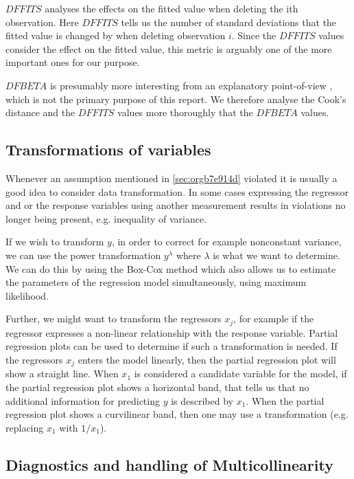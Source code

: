\documentclass[11pt]{article}
\begin{document}
\(DFFITS\) analyses the effects on the fitted value when deleting the ith observation. Here \(DFFITS\) tells us
the number of standard deviations that the fitted value is changed by when deleting observation \(i\). Since 
the \(DFFITS\) values consider the effect on the fitted value, this metric is arguably one of the more important 
ones for our purpose.

\(DFBETA\) is presumably more interesting from an explanatory point-of-view \cite{22286}, which is not the
primary purpose of this report. We therefore analyse the Cook's distance and the \(DFFITS\) values more
thoroughly that the \(DFBETA\) values.

\subsection{Transformations of variables}
\label{sec:org6a9f382}

Whenever an assumption mentioned in \ref{sec:orgb7e914d} violated it is usually a good idea to consider data 
transformation. In some cases expressing the regressor and or the response variables using another measurement
results in violations no longer being present, e.g. inequality of variance. 

If we wish to transform \(y\), in order to correct for example nonconstant variance, we can use the power
transformation \(y^\lambda\) where \(\lambda\) is what we want to determine. We can do this by using the Box-Cox method
which also allows us to estimate the parameters of the regression model simultaneously, using maximum likelihood.

Further, we might want to transform the regressors \(x_j\), for example if the regressor expresses a non-linear 
relationship with the response variable. Partial regression plots can be used to determine if such a transformation
is needed. If the regressors \(x_j\) enters the model linearly, then the partial regression plot will show a
straight line. When \(x_1\) is considered a candidate variable for the model, if the
partial regression plot shows a horizontal band, that tells us that no additional information for predicting \(y\) is 
described by \(x_1\). When the partial regression plot shows a curvilinear band, then one may use a transformation 
(e.g. replacing \(x_1\) with \(1/x_1\)).

\subsection{Diagnostics and handling of Multicollinearity}
\label{sec:orge4b1b42}
\end{document}
